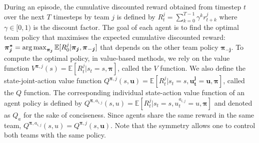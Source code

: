 During an episode, the cumulative discounted reward obtained from timestep $t$ over the next $T$ timesteps by team $j$ is defined by $R_{t}^j = \sum_{k=0}^{T-1} \gamma^k r^j_{t+k}$ where $\gamma \in [0, 1)$ is the discount factor.
The goal of each agent is to find the optimal team policy that maximises the expected cumulative discounted reward: $\mathbf{\pi_j^{*}} =\argmax_{\mathbf{\pi_j}} \mathbb{E}[R^j_0|\mathbf{\pi_{j}}, \mathbf{\pi_{-j}}]$ that depends on the other team policy $ \mathbf{\pi_{-j}}$.
To compute the optimal policy, in value-based methods, we rely on the value function $V^{\mathbf{\pi}, j}(s)=\mathbb{E}[R^j_t | s_t = s, \mathbf{\pi}]$, called the $V$ function.
We also define the state-joint-action value function $Q^{\mathbf{\pi}, j}(s,\mathbf{u})=\mathbb{E}[R^j_t | s_t=s, \mathbf{u^j_t}=\mathbf{u}, \mathbf{\pi}]$, called the $Q$ function.
The corresponding individual state-action value function of an agent policy is defined by $Q^{\mathbf{\pi}, a_{i, j}}(s,u)=\mathbb{E}[R^j_t | s_t=s, u^{a_{i, j}}_t=u, \mathbf{\pi}]$ and denoted as $Q_a$ for the sake of conciseness. Since agents share the same reward in the same team, $Q^{\mathbf{\pi}, a_{i, j}}(s,u)=Q^{\mathbf{\pi}, j}(s,\mathbf{u})$.
Note that the symmetry allows one to control both teams with the same policy.

